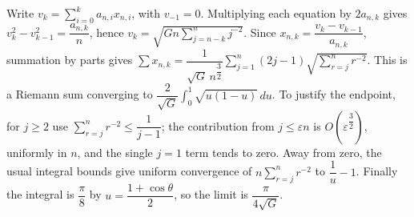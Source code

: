 Write $v_k=\sum_{i=0}^ka_{n,i}x_{n,i}$, with $v_{-1}=0$. Multiplying each equation by $2a_{n,k}$ gives $v_k^2 - v_{k-1}^2 = \dfrac{a_{n,k}}{n}$, hence $v_k=\sqrt{Gn\sum_{j=n-k}^n j^{-2}}$. Since $x_{n,k} = \dfrac{v_k-v_{k-1}}{a_{n,k}}$, summation by parts gives $\sum x_{n,k} = \dfrac{1}{\sqrt{G} \, n^{\dfrac{3}{2}}} \sum_{j=1}^n (2j-1) \sqrt{\sum_{r=j}^n r^{-2}}$. This is a Riemann sum converging to $\dfrac{2}{\sqrt G}\int_0^1\sqrt{u(1-u)}\,du$. To justify the endpoint, for $j\ge2$ use $\sum_{r=j}^n r^{-2} \le \dfrac{1}{j-1}$; the contribution from $j\le\varepsilon n$ is $O (\varepsilon^{\dfrac{3}{2}})$, uniformly in $n$, and the single $j=1$ term tends to zero. Away from zero, the usual integral bounds give uniform convergence of $n\sum_{r=j}^n r^{-2}$ to $\dfrac{1}{u} - 1$. Finally the integral is $\dfrac{\pi}{8}$ by $u = \dfrac{1+\cos\theta}{2}$, so the limit is $\boxed{\dfrac{\pi}{4\sqrt G}}$.
